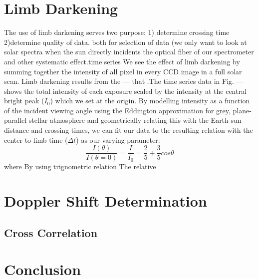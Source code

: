 \documentclass[authoryear, 12pt,5p, times]{elsarticle}
\begin{document}
\section{Limb Darkening}

The use of limb darkening serves two purpose: 1) determine crossing time 2)determine quality of data. both for selection of data (we only want to look at solar spectra when the sun directly incidents the optical fiber of our spectrometer and other systematic effect.time series 
We see the effect of limb darkening by summing together the intensity of all pixel in every CCD image in a full solar scan. Limb darkening results from the --- that .The time series data in Fig. --- shows the total intensity of each exposure scaled by the intensity at the central bright peak ($I_0$) which we set at the origin. By modelling intensity as a function of the incident viewing angle using the Eddington approximation for grey, plane-parallel stellar atmosphere and geometrically relating this with the Earth-sun distance and crossing times, we can fit our data to the resulting relation with the center-to-limb time ($\Delta t$) as our varying parameter: 
\begin{equation}
\frac{I(\theta)}{I(\theta=0)}=\frac{I}{I_0}= \frac{2}{5}+\frac{3}{5}cos\theta
\label{eddington}
\end{equation}
where 
By using trignometric relation 
The relative 
\section{Doppler Shift Determination}
\subsection{Cross Correlation}
\section{Conclusion}
 
\end{document}
